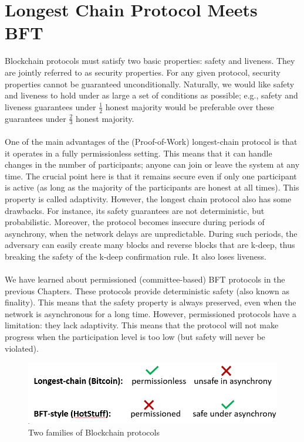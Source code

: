 \chapter{Longest Chain Protocol Meets BFT}
Blockchain protocols must satisfy two basic properties: safety and liveness. They are jointly referred to as security properties.
For any given protocol, security properties cannot be guaranteed unconditionally. Naturally, we would like safety and liveness to hold under as large a set of conditions as possible; e.g., safety and liveness guarantees under $\frac{1}{2}$
honest majority would be preferable over these guarantees under $\frac{2}{3}$ honest majority.\\\\
One of the main advantages of the (Proof-of-Work) longest-chain protocol is that it operates in a fully permissionless setting. This means that it can handle changes in the number of participants; anyone can join or leave the system at any time. The crucial point here is that it remains secure even if only one participant is active (as long as the majority of the participants are honest at all times). This property is called adaptivity. However, the longest chain protocol also has some drawbacks. For instance, its safety guarantees are not deterministic, but probabilistic. Moreover, the protocol becomes insecure during periods of asynchrony, when the network delays are unpredictable. During such periods, the adversary can easily create many blocks and reverse blocks that are k-deep, thus breaking the safety of the k-deep confirmation rule. It also loses liveness.\\\\
We have learned about permissioned (committee-based) BFT protocols in the previous Chapters. These protocols provide deterministic safety (also known as finality). This means that the safety property is always preserved, even when the network is asynchronous for a long time. However, permissioned protocols have a limitation: they lack adaptivity. This means that the protocol will not make progress when the participation level is too low (but safety will never be violated).
\begin{figure}[h!]
	\centering
	\includegraphics[width=0.4\linewidth]{Fig/17/F1}
	\caption{Two families of Blockchain protocols}
	\label{fig:L17_f1}
\end{figure}\\
